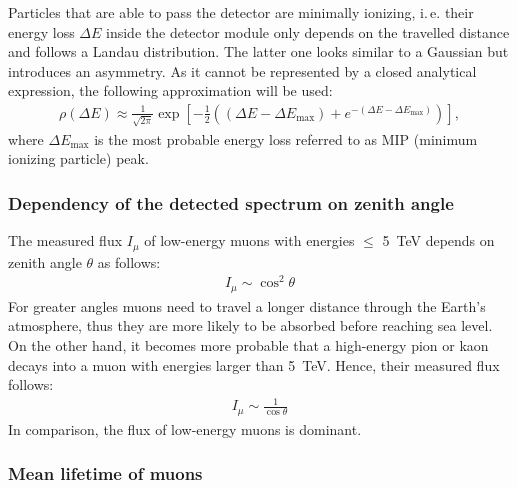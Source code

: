 Particles that are able to pass the detector are minimally ionizing, i.\,e. their energy loss $\Delta E$ inside the detector module only depends on the travelled distance and follows a Landau distribution.
The latter one looks similar to a Gaussian but introduces an asymmetry.
As it cannot be represented by a closed analytical expression, the following approximation \cite{landau} will be used:
\begin{align}
	\rho(\Delta E)\approx \frac{1}{\sqrt{2\pi}}\exp\left[ -\frac{1}{2}\left( \left(\Delta E-\Delta E_\text{max} \right) +e^{-\left(\Delta E-\Delta E_\text{max} \right)}\right) \right] ,
\end{align} 
where $\Delta E_\text{max}$ is the most probable energy loss referred to as MIP (minimum ionizing particle) peak.

\subsubsection{Dependency of the detected spectrum on zenith angle} \label{DependencyZenithAngle}

The measured flux $I_\mu$ of low-energy muons with energies $\leq$ \SI{5}{\tera\electronvolt} depends on zenith angle $\theta$ as follows:
\begin{align}
	I_\mu \sim \cos^2\theta
\end{align}
For greater angles muons need to travel a longer distance through the Earth's atmosphere, thus they are more likely to be absorbed before reaching sea level.
On the other hand, it becomes more probable that a high-energy pion or kaon decays into a muon with energies larger than \SI{5}{\tera\electronvolt}.
Hence, their measured flux follows:
\begin{align}
	I_\mu \sim \frac{1}{\cos\theta}
\end{align}
In comparison, the flux of low-energy muons is dominant.

\subsubsection{Mean lifetime of muons} \label{MeanLifetimeOfMuons}

